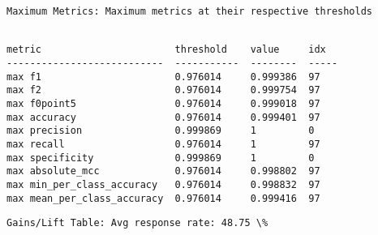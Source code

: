 \documentclass[11pt]{article}
\begin{document}
    
    \begin{Verbatim}[commandchars=\\\{\}]
Maximum Metrics: Maximum metrics at their respective thresholds


    \end{Verbatim}

    
    \begin{verbatim}
metric                       threshold    value     idx
---------------------------  -----------  --------  -----
max f1                       0.976014     0.999386  97
max f2                       0.976014     0.999754  97
max f0point5                 0.976014     0.999018  97
max accuracy                 0.976014     0.999401  97
max precision                0.999869     1         0
max recall                   0.976014     1         97
max specificity              0.999869     1         0
max absolute_mcc             0.976014     0.998802  97
max min_per_class_accuracy   0.976014     0.998832  97
max mean_per_class_accuracy  0.976014     0.999416  97
    \end{verbatim}

    
    \begin{Verbatim}[commandchars=\\\{\}]
Gains/Lift Table: Avg response rate: 48.75 \%


    \end{Verbatim}
\end{document}
